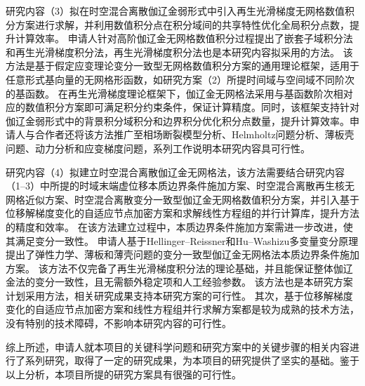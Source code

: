 研究内容（3）拟在时空混合离散伽辽金弱形式中引入再生光滑梯度无网格数值积分方案进行求解，并利用数值积分点在积分域间的共享特性优化全局积分点数，提升计算效率。
申请人针对高阶伽辽金无网格数值积分过程提出了嵌套子域积分法\cite{wang2016b}和再生光滑梯度积分法\cite{wang2019a}，再生光滑梯度积分法也是本研究内容拟采用的方法。
该方法是基于假定应变理论变分一致型无网格数值积分方案的通用理论框架，适用于任意形式基向量的无网格形函数，如研究方案（2）所提时间域与空间域不同阶次的基函数。
在再生光滑梯度理论框架下，伽辽金无网格法采用与基函数阶次相对应的数值积分方案即可满足积分约束条件，保证计算精度。同时，该框架支持针对伽辽金弱形式中的背景积分域积分和边界积分优化积分点数量，提升计算效率。申请人与合作者还将该方法推广至相场断裂模型分析\cite{wu2020a}、Helmholtz问题分析\cite{wang2020b}、薄板壳问题\cite{wu2023,wu2024}、动力分析\cite{Fu2022}和应变梯度问题\cite{du2022}，系列工作说明本研究内容具可行性。

研究内容（4）拟建立时空混合离散伽辽金无网格法，该方法需要结合研究内容（1--3）中所提的时域末端虚位移本质边界条件施加方案、时空混合离散再生核无网格近似方案、时空混合离散变分一致型伽辽金无网格数值积分方案，并引入基于位移解梯度变化的自适应节点加密方案和求解线性方程组的并行计算库，提升方法的精度和效率。
在该方法建立过程中，本质边界条件施加方案需进一步改进，使其满足变分一致性。
申请人基于Hellinger--Reissner和Hu--Washizu多变量变分原理提出了弹性力学、薄板和薄壳问题的变分一致型伽辽金无网格法本质边界条件施加方案\cite{Wu2022b,wu2023,wu2024}。
该方法不仅完备了再生光滑梯度积分法的理论基础，并且能保证整体伽辽金法的变分一致性，且无需额外稳定项和人工经验参数。
该方法也是本研究方案计划采用方法，相关研究成果支持本研究方案的可行性。
其次，基于位移解梯度变化的自适应节点加密方案和线性方程组并行求解方案都是较为成熟的技术方法，没有特别的技术障碍，不影响本研究内容的可行性。

综上所述，申请人就本项目的关键科学问题和研究方案中的关键步骤的相关内容进行了系列研究，取得了一定的研究成果，为本项目的研究提供了坚实的基础。鉴于以上分析，本项目所提的研究方案具有很强的可行性。

